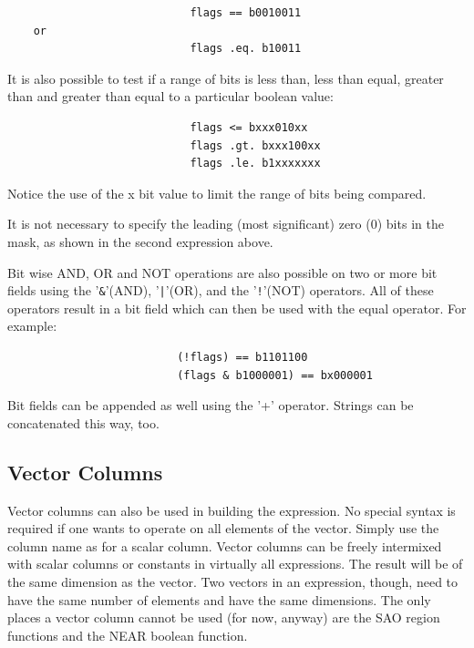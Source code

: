\documentclass[11pt]{book}
\begin{document}
\begin{verbatim}
                            flags == b0010011
    or
                            flags .eq. b10011
\end{verbatim}

    It is also possible to test if a range of bits is  less  than,  less
    than  equal,  greater  than  and  greater than equal to a particular
    boolean value:


\begin{verbatim}
                            flags <= bxxx010xx
                            flags .gt. bxxx100xx
                            flags .le. b1xxxxxxx
\end{verbatim}

    Notice the use of the x bit value to limit the range of  bits  being
    compared.

    It  is  not necessary to specify the leading (most significant) zero
    (0) bits in the mask, as shown in the second expression above.

    Bit wise AND, OR and NOT operations are  also  possible  on  two  or
    more  bit  fields  using  the  '\verb+&+'(AND),  '\verb+|+'(OR),  and the '\verb+!+'(NOT)
    operators. All of these operators result in a bit  field  which  can
    then be used with the equal operator. For example:


\begin{verbatim}
                          (!flags) == b1101100
                          (flags & b1000001) == bx000001
\end{verbatim}

    Bit  fields can be appended as well using the '+' operator.  Strings
    can be concatenated this way, too.


\subsection{Vector Columns}

    Vector columns can also be used  in  building  the  expression.   No
    special  syntax  is required if one wants to operate on all elements
    of the vector.  Simply use the column name as for a  scalar  column.
    Vector  columns  can  be  freely  intermixed  with scalar columns or
    constants in virtually all expressions.  The result will be  of  the
    same dimension as the vector.  Two vectors in an expression, though,
    need to  have  the  same  number  of  elements  and  have  the  same
    dimensions.   The  only  places  a vector column cannot be used (for
    now, anyway) are the SAO  region  functions  and  the  NEAR  boolean
    function.
\end{document}
